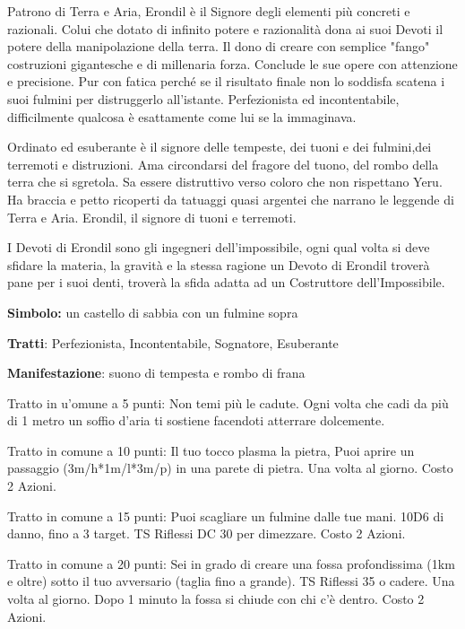 \documentclass[a4paper,11pt,twoside,openany]{book}
\begin{document}
{\label{erondil}

Patrono di Terra e Aria, Erondil è il Signore degli elementi più concreti e razionali. Colui che dotato di infinito potere e razionalità dona ai suoi Devoti il potere della manipolazione della terra. Il dono di creare con semplice "fango" costruzioni gigantesche e di millenaria forza. Conclude le sue opere con attenzione e precisione.
Pur con fatica perché se il risultato finale non lo soddisfa scatena i suoi fulmini per distruggerlo all'istante. Perfezionista ed incontentabile, difficilmente qualcosa è esattamente come lui se la immaginava. 

Ordinato ed esuberante è il signore delle tempeste, dei tuoni e dei fulmini,dei terremoti e distruzioni. Ama circondarsi del fragore del tuono, del rombo della terra che si sgretola. Sa essere distruttivo verso coloro che non rispettano Yeru.
Ha braccia e petto ricoperti da tatuaggi quasi argentei che narrano le leggende di Terra e Aria. Erondil, il signore di tuoni e terremoti.


I Devoti di Erondil sono gli ingegneri dell'impossibile, ogni qual volta si deve sfidare la materia, la gravità e la stessa ragione un Devoto di Erondil troverà pane per i suoi denti, troverà la sfida adatta ad un Costruttore dell'Impossibile.

\textbf{Simbolo:} un castello di sabbia con un fulmine sopra

\textbf{Tratti}: Perfezionista, Incontentabile, Sognatore, Esuberante

\textbf{Manifestazione}: suono di tempesta e rombo di frana

\bigskip

Tratto in u'omune a 5 punti: Non temi più le cadute. Ogni volta che cadi da più di 1 metro un soffio d'aria ti sostiene facendoti atterrare dolcemente.

Tratto in comune a 10 punti: Il tuo tocco plasma la pietra, Puoi aprire un passaggio (3m/h{*}1m/l{*}3m/p) in una parete di pietra. Una volta al giorno. Costo 2 Azioni.

Tratto in comune a 15 punti: Puoi scagliare un fulmine dalle tue mani. 10D6 di danno, fino a 3 target. TS Riflessi DC 30 per dimezzare. Costo 2 Azioni.

Tratto in comune a 20 punti: Sei in grado di creare una fossa profondissima (1km e oltre) sotto il tuo avversario (taglia fino a grande). TS Riflessi 35 o cadere. Una volta al giorno. Dopo 1 minuto la fossa si chiude con chi c'è dentro. Costo 2 Azioni.

}
\end{document}
